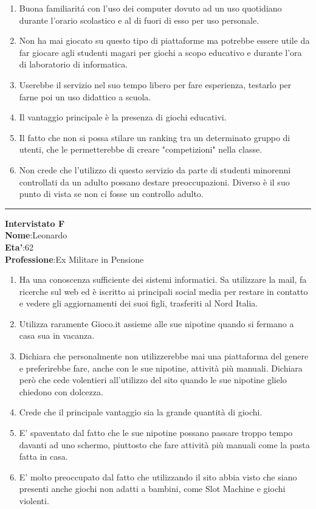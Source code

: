 \documentclass[../Report.tex]{subfiles}
\begin{document}
    \begin{enumerate}
        \item Buona familiaritá con l’uso dei computer dovuto ad un uso quotidiano durante l’orario scolastico e al di fuori di esso per uso personale.
        \item Non ha mai giocato su questo tipo di piattaforme ma potrebbe essere utile da far giocare agli studenti magari per giochi a scopo educativo e durante l’ora di laboratorio di informatica.
        \item Userebbe il servizio nel suo tempo libero per fare esperienza, testarlo per farne poi un uso didattico a scuola.
        \item Il vantaggio principale è la presenza di giochi educativi.
        \item Il fatto che non si possa stilare un ranking tra un determinato gruppo di utenti, che le permetterebbe di creare "competizioni" nella classe.
        \item Non crede che l’utilizzo di questo servizio da parte di studenti minorenni controllati da un adulto possano destare preoccupazioni. Diverso è il suo punto di vista se non ci fosse un controllo adulto. 
    \end{enumerate}
    
    \hrule
    \textbf{Intervistato F}\\
    \textbf{Nome}:Leonardo \\
    \textbf{Eta'}:62\\
    \textbf{Professione}:Ex Militare in Pensione

    \begin{enumerate}
        \item Ha una conoscenza sufficiente dei sistemi informatici. Sa utilizzare la mail, fa ricerche sul web ed è iscritto ai principali social media per restare in contatto e vedere gli aggiornamenti dei suoi figli, trasferiti al Nord Italia. 
        \item Utilizza raramente Gioco.it assieme alle sue nipotine quando si fermano a casa sua in vacanza. 
        \item Dichiara che personalmente non utilizzerebbe mai una piattaforma del genere e preferirebbe fare, anche con le sue nipotine, attività più manuali. Dichiara però che cede volentieri all'utilizzo del sito quando le sue nipotine glielo chiedono con dolcezza. 
        \item Crede che il principale vantaggio sia la grande quantità di giochi. 
        \item E' spaventato dal fatto che le sue nipotine possano passare troppo tempo davanti ad uno schermo, piuttosto che fare attività più manuali come la pasta fatta in casa. 
        \item E' molto preoccupato dal fatto che utilizzando il sito abbia visto che siano presenti anche giochi non adatti a bambini, come Slot Machine e giochi violenti.    
    \end{enumerate}
    \newpage
\end{document}
